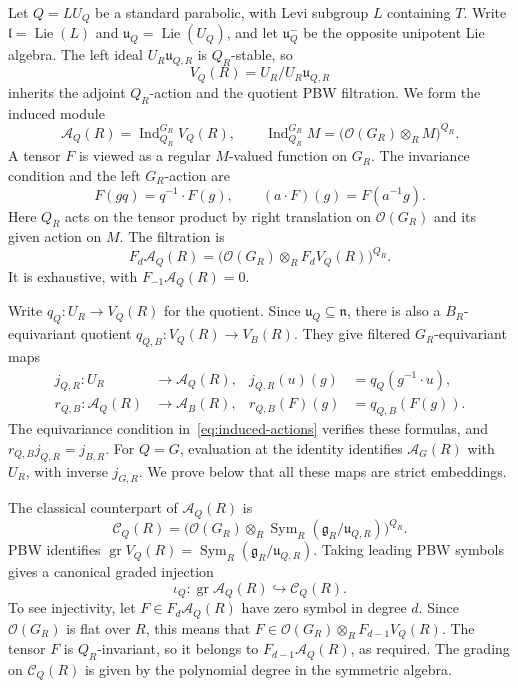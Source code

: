 \documentclass[twoside,a4paper,12pt,reqno]{amsart}
\theoremstyle{remark}
\numberwithin{equation}{section}
\newcommand{\cO}{\mathcal O}
\newcommand{\fg}{\mathfrak g}
\newcommand{\fn}{\mathfrak n}
\newcommand{\fl}{\mathfrak l}
\newcommand{\fu}{\mathfrak u}
\newcommand{\cA}{\mathcal A}
\DeclareMathOperator{\Sym}{Sym}
\DeclareMathOperator{\Lie}{Lie}
\DeclareMathOperator{\gr}{gr}
\newcommand{\into}{\hookrightarrow}
\begin{document}
Let \(Q=LU_Q\) be a standard parabolic, with Levi subgroup \(L\)
containing \(T\). Write \(\fl=\Lie(L)\) and
\(\fu_Q=\Lie(U_Q)\), and let \(\fu_Q^-\) be the opposite unipotent
Lie algebra. The left ideal \(U_R\fu_{Q,R}\) is \(Q_R\)-stable, so
\[
V_Q(R)=U_R/U_R\fu_{Q,R}
\]
inherits the adjoint \(Q_R\)-action and the quotient PBW filtration. We form the induced module
\[
\cA_Q(R)=\operatorname{Ind}_{Q_R}^{G_R}V_Q(R),
\qquad
\operatorname{Ind}_{Q_R}^{G_R}M
=\bigl(\cO(G_R)\otimes_R M\bigr)^{Q_R}.
\]
A tensor \(F\) is viewed as a regular \(M\)-valued function on \(G_R\).
The invariance condition and the left \(G_R\)-action are
\begin{equation}\label{eq:induced-actions}
F(gq)=q^{-1}\cdot F(g),\qquad
(a\cdot F)(g)=F(a^{-1}g).
\end{equation}
Here \(Q_R\) acts on the tensor product by right translation on
\(\cO(G_R)\) and its given action on \(M\). The filtration is
\[
F_d\cA_Q(R)=
\bigl(\cO(G_R)\otimes_R F_dV_Q(R)\bigr)^{Q_R}.
\]
It is exhaustive, with \(F_{-1}\cA_Q(R)=0\).

Write \(q_Q:U_R\to V_Q(R)\) for the quotient. Since
\(\fu_Q\subseteq\fn\), there is also a \(B_R\)-equivariant quotient
\(q_{Q,B}:V_Q(R)\to V_B(R)\). They give filtered
\(G_R\)-equivariant maps
\begin{equation}\label{eq:filtered-comparison-maps}
\begin{aligned}
j_{Q,R}:U_R&\longrightarrow\cA_Q(R),
&j_{Q,R}(u)(g)&=q_Q(g^{-1}\cdot u),\\
r_{Q,B}:\cA_Q(R)&\longrightarrow\cA_B(R),
&r_{Q,B}(F)(g)&=q_{Q,B}(F(g)).
\end{aligned}
\end{equation}
The equivariance condition in~\eqref{eq:induced-actions} verifies
these formulas, and \(r_{Q,B}j_{Q,R}=j_{B,R}\).
For \(Q=G\), evaluation at the identity identifies
\(\cA_G(R)\) with \(U_R\), with inverse \(j_{G,R}\).
We prove below that all these maps are strict embeddings.

The classical counterpart of \(\cA_Q(R)\) is
\[
\mathcal C_Q(R)=
\bigl(\cO(G_R)\otimes_R\Sym_R(\fg_R/\fu_{Q,R})\bigr)^{Q_R}.
\]
PBW identifies
\(\gr V_Q(R)=\Sym_R(\fg_R/\fu_{Q,R})\).
Taking leading PBW symbols gives a canonical graded injection
\[
\iota_Q:\gr\cA_Q(R)\into\mathcal C_Q(R).
\]
To see injectivity, let \(F\in F_d\cA_Q(R)\) have zero symbol in degree \(d\).
Since \(\cO(G_R)\) is flat over \(R\), this means that
\(F\in\cO(G_R)\otimes_R F_{d-1}V_Q(R)\).
The tensor \(F\) is \(Q_R\)-invariant, so it belongs to
\(F_{d-1}\cA_Q(R)\), as required.
The grading on \(\mathcal C_Q(R)\) is given by the polynomial degree
in the symmetric algebra.
\end{document}
